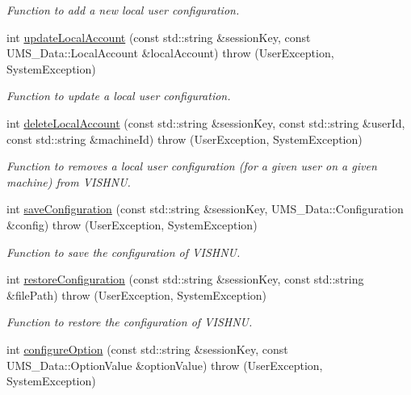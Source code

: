 \begin{DoxyCompactItemize}
\begin{DoxyCompactList}\small\item\em Function to add a new local user configuration. \item\end{DoxyCompactList}\item 
int \hyperlink{namespacevishnu_ac51341ab58c1ed606b254262fbc053dc}{updateLocalAccount} (const std::string \&sessionKey, const UMS\_\-Data::LocalAccount \&localAccount)  throw (UserException, SystemException)
\begin{DoxyCompactList}\small\item\em Function to update a local user configuration. \item\end{DoxyCompactList}\item 
int \hyperlink{namespacevishnu_a2b51028779571b21c45a2a75cd362c59}{deleteLocalAccount} (const std::string \&sessionKey, const std::string \&userId, const std::string \&machineId)  throw (UserException, SystemException)
\begin{DoxyCompactList}\small\item\em Function to removes a local user configuration (for a given user on a given machine) from VISHNU. \item\end{DoxyCompactList}\item 
int \hyperlink{namespacevishnu_a2ecc54aee4da202b1caa94dfa6a43d17}{saveConfiguration} (const std::string \&sessionKey, UMS\_\-Data::Configuration \&config)  throw (UserException, SystemException)
\begin{DoxyCompactList}\small\item\em Function to save the configuration of VISHNU. \item\end{DoxyCompactList}\item 
int \hyperlink{namespacevishnu_a60ecb3b47532d0df7b0d44fdf43f98f4}{restoreConfiguration} (const std::string \&sessionKey, const std::string \&filePath)  throw (UserException, SystemException)
\begin{DoxyCompactList}\small\item\em Function to restore the configuration of VISHNU. \item\end{DoxyCompactList}\item 
int \hyperlink{namespacevishnu_a5b88fcd36b780df012b2529fe3526ca1}{configureOption} (const std::string \&sessionKey, const UMS\_\-Data::OptionValue \&optionValue)  throw (UserException, SystemException)

\end{DoxyCompactItemize}
